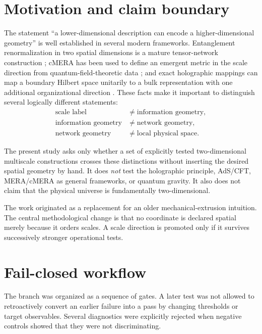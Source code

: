 \documentclass[11pt,a4paper]{article}
\begin{document}
\section{Motivation and claim boundary}
The statement ``a lower-dimensional description can encode a higher-dimensional geometry'' is well established in several modern frameworks. Entanglement renormalization in two spatial dimensions is a mature tensor-network construction \cite{evenbly2009}; cMERA has been used to define an emergent metric in the scale direction from quantum-field-theoretic data \cite{nozaki2012}; and exact holographic mappings can map a boundary Hilbert space unitarily to a bulk representation with one additional organizational direction \cite{qi2013}. These facts make it important to distinguish several logically different statements:
\begin{align*}
\text{scale label} &\neq \text{information geometry},\\
\text{information geometry} &\neq \text{network geometry},\\
\text{network geometry} &\neq \text{local physical space}.
\end{align*}

The present study asks only whether a set of explicitly tested two-dimensional multiscale constructions crosses these distinctions without inserting the desired spatial geometry by hand. It does \emph{not} test the holographic principle, AdS/CFT, MERA/cMERA as general frameworks, or quantum gravity. It also does not claim that the physical universe is fundamentally two-dimensional.

The work originated as a replacement for an older mechanical-extrusion intuition. The central methodological change is that no coordinate is declared spatial merely because it orders scales. A scale direction is promoted only if it survives successively stronger operational tests.

\section{Fail-closed workflow}
The branch was organized as a sequence of gates. A later test was not allowed to retroactively convert an earlier failure into a pass by changing thresholds or target observables. Several diagnostics were explicitly rejected when negative controls showed that they were not discriminating.
\end{document}
